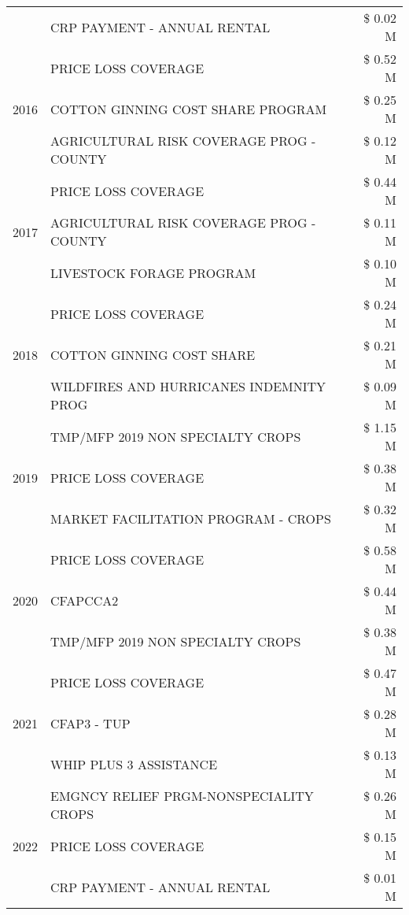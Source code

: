 \begin{tabular}{llr}
 & CRP PAYMENT - ANNUAL RENTAL & \$ 0.02 M \\
\cline{1-3}
\multirow[t]{3}{*}{2016} & PRICE LOSS COVERAGE & \$ 0.52 M \\
 & COTTON GINNING COST SHARE PROGRAM & \$ 0.25 M \\
 & AGRICULTURAL RISK COVERAGE PROG - COUNTY & \$ 0.12 M \\
\cline{1-3}
\multirow[t]{3}{*}{2017} & PRICE LOSS COVERAGE & \$ 0.44 M \\
 & AGRICULTURAL RISK COVERAGE PROG - COUNTY & \$ 0.11 M \\
 & LIVESTOCK FORAGE PROGRAM & \$ 0.10 M \\
\cline{1-3}
\multirow[t]{3}{*}{2018} & PRICE LOSS COVERAGE & \$ 0.24 M \\
 & COTTON GINNING COST SHARE & \$ 0.21 M \\
 & WILDFIRES AND HURRICANES INDEMNITY PROG & \$ 0.09 M \\
\cline{1-3}
\multirow[t]{3}{*}{2019} & TMP/MFP 2019 NON SPECIALTY CROPS & \$ 1.15 M \\
 & PRICE LOSS COVERAGE & \$ 0.38 M \\
 & MARKET FACILITATION PROGRAM - CROPS & \$ 0.32 M \\
\cline{1-3}
\multirow[t]{3}{*}{2020} & PRICE LOSS COVERAGE & \$ 0.58 M \\
 & CFAPCCA2 & \$ 0.44 M \\
 & TMP/MFP 2019 NON SPECIALTY CROPS & \$ 0.38 M \\
\cline{1-3}
\multirow[t]{3}{*}{2021} & PRICE LOSS COVERAGE & \$ 0.47 M \\
 & CFAP3 - TUP & \$ 0.28 M \\
 & WHIP PLUS 3 ASSISTANCE & \$ 0.13 M \\
\cline{1-3}
\multirow[t]{3}{*}{2022} & EMGNCY RELIEF PRGM-NONSPECIALITY CROPS & \$ 0.26 M \\
 & PRICE LOSS COVERAGE & \$ 0.15 M \\
 & CRP PAYMENT - ANNUAL RENTAL & \$ 0.01 M \\
\cline{1-3}
\bottomrule
\end{tabular}
